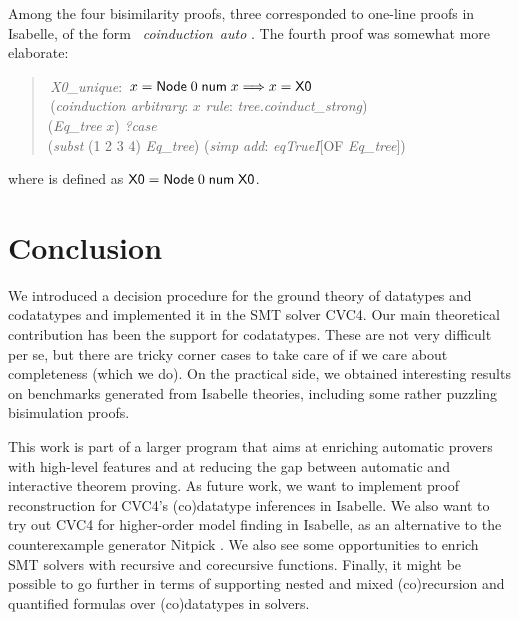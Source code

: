 Among the four bisimilarity proofs, three corresponded to one-line
proofs in Isabelle, of the form ~\textit{coinduction}~\textit{auto}
\cite{blanchette-et-al-2014-impl}. The fourth proof was somewhat more elaborate:
%
\begin{quote}
 \,\textit{X0\_unique}: \,$x = \textsf{Node}\;0\;\textsf{num}\; x \Longrightarrow x = \textsf{X0}$ \\
 \,(\textit{coinduction arbitrary}: $x$ \textit{rule}: \textit{tree.coinduct\_strong}) \\
\noindent\hbox{}\quad  {} (\textit{Eq\_tree} $x$)  \textit{?case} \\
\noindent\hbox{}\qquad  {} (\textit{subst} (1 2 3 4) \textit{Eq\_tree}) (\textit{simp add}: \textit{eqTrueI}[OF \textit{Eq\_tree}]) \\
\end{quote}
%
\noindent
where  is defined as $\textsf{X0} =
\textsf{Node}\;0\;\textsf{num}\;\textsf{X0}$.

\section{Conclusion}
\label{sec:conclusion}

We introduced a decision procedure for the ground theory of datatypes and
codatatypes and implemented it in the SMT solver CVC4. Our main theoretical
contribution has been the support for codatatypes. These are not very
difficult per se, but there are tricky corner cases to take care of if we care
about completeness (which we do).
On the practical side, we obtained
interesting results on benchmarks generated from Isabelle theories, including
some rather
puzzling bisimulation proofs.

This work is part of a larger program that aims at enriching automatic provers
with high-level features and at reducing the gap between automatic and
interactive theorem proving. As future work, we want to implement proof
reconstruction for CVC4's (co)datatype inferences in Isabelle. We also want to
try out CVC4 for higher-order model finding in Isabelle, as an alternative to
the counterexample generator Nitpick \cite{blanchette-nipkow-2010}. We also
see some opportunities to enrich SMT solvers with recursive and corecursive
functions. Finally, it might be possible to go further in terms of supporting
nested and mixed (co)recursion and quantified formulas over (co)datatypes in
solvers.

